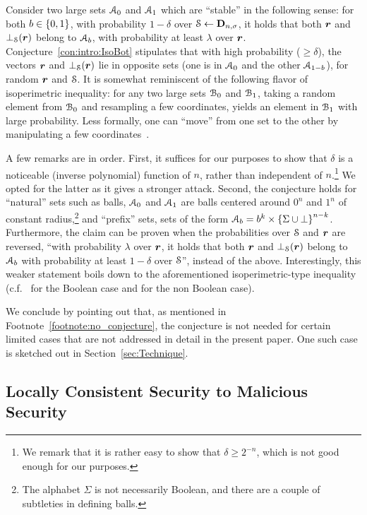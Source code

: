 \noindent
Consider two large sets $\mathcal{A}_0$ and $\mathcal{A}_1$ which are ``stable'' in the following sense: for both $b\in \{0,1\}$, with probability $1-\delta$ over $\mathcal{S}\gets \mathbf{D}_{n,\sigma}$, it holds that both ${ \boldsymbol{r}}$ and $\bot_{\mathcal{S}}({ \boldsymbol{r}})$ belong to $\mathcal{A}_b$, with probability at least $\lambda$ over ${ \boldsymbol{r}}$. Conjecture~\ref{con:intro:IsoBot} stipulates that with high probability ($\ge \delta$), the vectors ${ \boldsymbol{r}}$ and $\bot_{\mathcal{S}}({ \boldsymbol{r}})$ lie in opposite sets (\ie one is in $\mathcal{A}_0$ and the other $\mathcal{A}_{1-b}$), for random ${ \boldsymbol{r}}$ and $\mathcal{S}$. It is somewhat reminiscent of the following flavor of isoperimetric inequality: for any two large sets $\mathcal{B}_0$ and $\mathcal{B}_1$, taking a random element from $\mathcal{B}_0$ and resampling a few coordinates, yields an element in $\mathcal{B}_1$ with large probability. Less formally, one can ``move'' from one set to the other by manipulating a few coordinates~\cite{MosselORSS2006,MosselOS2013}.

A few remarks are in order. First, it suffices for our purposes to show that $\delta$ is a noticeable (\ie inverse polynomial) function of $n$, rather than independent of $n$.\footnote{We remark that it is rather easy to show that $\delta\ge 2^{-n}$, which is not good enough for our purposes.} We opted for the latter as it gives a stronger attack. Second, the conjecture holds for ``natural'' sets such as balls, \ie $\mathcal{A}_0$ and $\mathcal{A}_1$ are balls centered around $0^n$ and $1^n$ of constant radius,\footnote{The alphabet $\Sigma$ is not necessarily Boolean, and there are a couple of subtleties in defining balls.} and ``prefix'' sets, \ie sets of the form $\mathcal{A}_b=b^k \times \left\{\Sigma \cup \bot\right\}^{n-k}$. Furthermore, the claim can be proven when the probabilities over $\mathcal{S}$ and ${ \boldsymbol{r}}$ are reversed, \ie ``with probability $\lambda$ over ${ \boldsymbol{r}}$, it holds that both ${ \boldsymbol{r}}$ and $\bot_{\mathcal{S}}({ \boldsymbol{r}})$ belong to $\mathcal{A}_b$ with probability at least $1-\delta$ over $\mathcal{S}$'', instead of the above. Interestingly, this weaker statement boils down to the aforementioned isoperimetric-type inequality (c.f.~\cite{MosselORSS2006} for the Boolean case and \cite{MosselOS2013} for the non Boolean case).

We conclude by pointing out that, as mentioned in Footnote~\ref{footnote:no_conjecture}, the conjecture is not needed for certain limited cases that are not addressed in detail in the present paper. One such case is sketched out in Section~\ref{sec:Technique}.

\subsection{Locally Consistent Security to Malicious Security}\label{sec:intro:LocalToFull}

